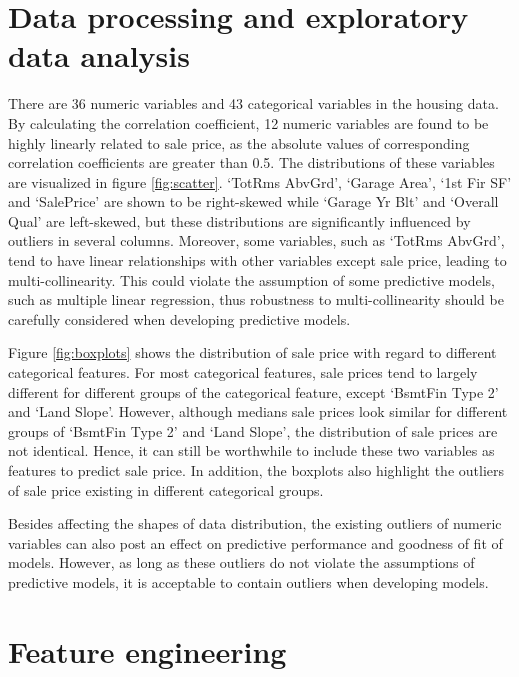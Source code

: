 \documentclass[letterpaper,12pt,twoside,]{pinp}
\begin{document}
\hypertarget{data-processing-and-exploratory-data-analysis}{%
\section{Data processing and exploratory data
analysis}\label{data-processing-and-exploratory-data-analysis}}

There are 36 numeric variables and 43 categorical variables in the
housing data. By calculating the correlation coefficient, 12 numeric
variables are found to be highly linearly related to sale price, as the
absolute values of corresponding correlation coefficients are greater
than 0.5. The distributions of these variables are visualized in figure
\ref{fig:scatter}. `TotRms AbvGrd', `Garage Area', `1st Fir SF' and
`SalePrice' are shown to be right-skewed while `Garage Yr Blt' and
`Overall Qual' are left-skewed, but these distributions are
significantly influenced by outliers in several columns. Moreover, some
variables, such as `TotRms AbvGrd', tend to have linear relationships
with other variables except sale price, leading to multi-collinearity.
This could violate the assumption of some predictive models, such as
multiple linear regression, thus robustness to multi-collinearity should
be carefully considered when developing predictive models.

Figure \ref{fig:boxplots} shows the distribution of sale price with
regard to different categorical features. For most categorical features,
sale prices tend to largely different for different groups of the
categorical feature, except `BsmtFin Type 2' and `Land Slope'. However,
although medians sale prices look similar for different groups of
`BsmtFin Type 2' and `Land Slope', the distribution of sale prices are
not identical. Hence, it can still be worthwhile to include these two
variables as features to predict sale price. In addition, the boxplots
also highlight the outliers of sale price existing in different
categorical groups.

Besides affecting the shapes of data distribution, the existing outliers
of numeric variables can also post an effect on predictive performance
and goodness of fit of models. However, as long as these outliers do not
violate the assumptions of predictive models, it is acceptable to
contain outliers when developing models.

\hypertarget{feature-engineering}{%
\section{Feature engineering}\label{feature-engineering}}
\end{document}
